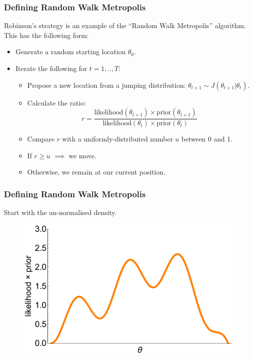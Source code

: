 \documentclass[handout]{beamer}
\begin{document}
\begin{frame}
\frametitle{Defining Random Walk Metropolis}
Robinson's strategy is an example of the ``Random Walk Metropolis'' algorithm. This has the following form:

\begin{itemize}
\item<2-> Generate a random starting location $\theta_0$.
\item<3-> Iterate the following for $t=1,..,T$:
\begin{itemize}
\item<4-> Propose a new location from a jumping distribution: $\theta_{t+1}\sim J(\theta_{t+1}|\theta_t)$.
\item<5-> Calculate the ratio:
\begin{equation}
r = \frac{\text{likelihood}(\theta_{t+1})\times\text{prior}(\theta_{t+1})}{\text{likelihood}(\theta_{t})\times\text{prior}(\theta_{t})}
\end{equation}
\item<7-> Compare $r$ with a uniformly-distributed number $u$ between 0 and 1.
\item<8-> If $r\geq u$ $\implies$ we move.
\item<9-> Otherwise, we remain at our current position.
\end{itemize}
\end{itemize}

\end{frame}

\begin{frame}
\frametitle{Defining Random Walk Metropolis}
Start with the un-normalised density.

\begin{figure}[ht]
\centerline{\includegraphics[width=1\textwidth]{animations_figures/lec4_metropolisDefinition1.pdf}}
\end{figure}

\end{frame}
\end{document}

